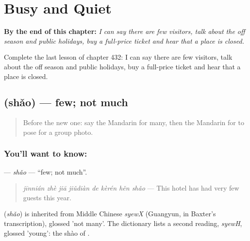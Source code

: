 
\chapter{Busy and Quiet}
\label{ch:zh-busy-and-quiet}

\begin{chapteropening}
\textbf{By the end of this chapter:} \emph{I can say there are few visitors, talk about the off season and public holidays, buy a full-price ticket and hear that a place is closed.}

Complete the last lesson of chapter 432: I can say there are few visitors, talk about the off season and public holidays, buy a full-price ticket and hear that a place is closed.
\end{chapteropening}

\section[\texorpdfstring{\zh{少} (shǎo)}{少 (shǎo)}]{ (shǎo) — few; not much}

\label{lesson:ZH-C432-shao}



\begin{quote}
Before the new one: say the Mandarin for many, then the Mandarin for to pose for a group photo.
\end{quote}

\subsection*{You'll want to know: }
\textbf{} — \emph{shǎo} — \textquotedblleft{}few; not much\textquotedblright{}.

\begin{quote}
\textbf{} \emph{jīnnián zhè jiā jiǔdiàn de kèrén hěn shǎo} — This hotel has had very few guests this year.
\end{quote}

\begin{cousinweb}
\textbf{} (\emph{shǎo}) is inherited from Middle Chinese \emph{syewX} (Guangyun, in Baxter's transcription), glossed 'not many'. The dictionary lists a second reading, \emph{syewH}, glossed 'young': the shào of .
\end{cousinweb}

